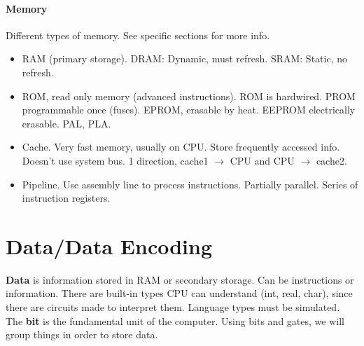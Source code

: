 \documentclass[12 pt]{article}
\begin{document}
	\paragraph{Memory}
	Different types of memory. See specific sections for more info.
	\begin{itemize}
		\item RAM (primary storage). DRAM: Dynamic, must refresh. SRAM: Static, no refresh.
		\item ROM, read only memory (advanced instructions). ROM is hardwired. PROM programmable once (fuses). EPROM, erasable by heat. EEPROM electrically erasable. PAL, PLA.
		\item Cache. Very fast memory, usually on CPU. Store frequently accessed info. Doesn't use system bus. 1 direction, cache1 $\to$ CPU and CPU $\to$ cache2.
		\item Pipeline. Use assembly line to process instructions. Partially parallel. Series of instruction registers.
	\end{itemize}
	\section{Data/Data Encoding}
	\textbf{Data} is information stored in RAM or secondary storage. Can be instructions or information. There are built-in types CPU can understand (int, real, char), since there are circuits made to interpret them. Language types must be simulated. The \textbf{bit} is the fundamental unit of the computer. Using bits and gates, we will group things in order to store data.
\end{document}
